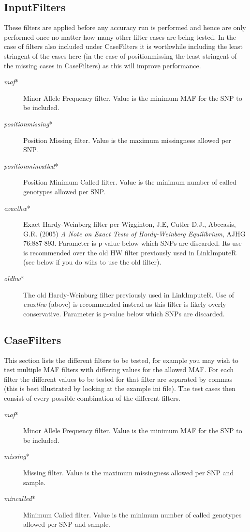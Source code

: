 \documentclass[10pt]{report}
\begin{document}
\subsection{InputFilters}
These filters are applied before any accuracy run is performed and hence are only performed once no matter how many other filter cases are being tested.  In the case of filters also included under CaseFilters it is worthwhile including the least stringent of the cases here (in the case of positionmissing the least stringent of the missing cases in CaseFilters) as this will improve performance.
\begin{description}
\item[\emph{maf}*] Minor Allele Frequency filter.  Value is the minimum MAF for the SNP to be included.
\item[\emph{positionmissing}*] Position Missing filter. Value is the maximum missingness allowed per SNP.
\item[\emph{positionmincalled}*] Position Minimum Called filter.  Value is the minimum number of called genotypes allowed per SNP.
\item[\emph{exacthw}*] Exact Hardy-Weinberg filter per Wigginton, J.E, Cutler D.J., Abecasis, G.R. (2005) \emph{A Note on Exact Tests of Hardy-Weinberg Equilibrium}, AJHG 76:887-893.  Parameter is p-value below which SNPs are discarded.  Its use is recommended over the old HW filter previously used in LinkImputeR (see below if you do wihs to use the old filter).
\item[\emph{oldhw}*] The old Hardy-Weinburg filter previously used in LinkImputeR.  Use of \emph{exaxthw} (above) is recommended instead as this filter is likely overly conservative.  Parameter is p-value below which SNPs are discarded.
\end{description}

\subsection{CaseFilters}
This section lists the different filters to be tested, for example you may wish to test multiple MAF filters with differing values for the allowed MAF.  For each filter the different values to be tested for that filter are separated by commas (this is best illustrated by looking at the example ini file).  The test cases then consist of every possible combination of the different filters.
\begin{description}
\item[\emph{maf}*] Minor Allele Frequency filter.  Value is the minimum MAF for the SNP to be included.
\item[\emph{missing}*] Missing filter.  Value is the maximum missingness allowed per SNP and sample.
\item[\emph{mincalled}*] Minimum Called filter.  Value is the minimum number of called genotypes allowed per SNP and sample.
\end{description}
\end{document}
